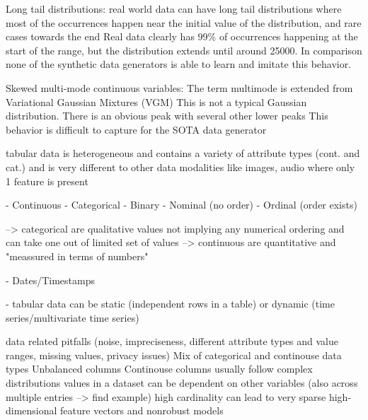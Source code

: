 Long tail distributions:\cite{zhao2022CTABGANEnhancingTabular}
    real world data can have long tail distributions where most of the occurrences happen near the initial value of the distribution, and rare cases towards the end
    Real data clearly has 99\% of occurrences happening at the start of the range, 
    but the distribution extends until around 25000. 
    In comparison none of the synthetic data generators is able to learn and imitate this behavior.

Skewed multi-mode continuous variables:\cite{zhao2022CTABGANEnhancingTabular}
    The term multimode is extended from Variational Gaussian Mixtures (VGM)
    This is not a typical Gaussian distribution. There is an obvious peak
    with several other lower peaks
    This behavior is difficult to capture for the SOTA data generator


tabular data is heterogeneous and contains a variety of attribute types (cont. and cat.) \cite{borisov2022DeepNeuralNetworks}
and is very different to other data modalities like images, audio where only 1 feature is present \cite{borisov2022DeepNeuralNetworks}

- Continuous \cite{lederrey2022DATGANIntegratingExperta}
- Categorical 
    - Binary
    - Nominal (no order)
    - Ordinal (order exists)
\cite{lederrey2022DATGANIntegratingExperta}

--> categorical are qualitative values not implying any numerical ordering and can take one out of limited set of values \cite{lane2003IntroductionStatistics}
--> continuous are quantitative and "meassured in terms of numbers"

- Dates/Timestamps \cite{hernandez2022SyntheticDataGeneration}

- tabular data can be static (independent rows in a table) or dynamic (time series/multivariate time series) \cite{padhi2021TabularTransformersModeling}



data related pitfalls (noise, impreciseness, different attribute types and value ranges, missing values, privacy issues) \cite{borisov2022DeepNeuralNetworks}
Mix of categorical and continouse data types \cite{li2021ImprovingGANInverse}
Unbalanced columns \cite{li2021ImprovingGANInverse}
Continouse columns usually follow complex distributions \cite{li2021ImprovingGANInverse}
values in a dataset can be dependent on other variables \cite{lederrey2022DATGANIntegratingExperta} (also across multiple entries --> find example)
high cardinality can lead to very sparse high-dimensional feature vectors and nonrobust models \cite{borisov2022DeepNeuralNetworks}


